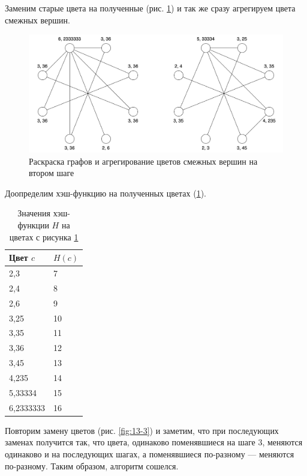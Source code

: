 \documentclass[12pt, a4paper]{extarticle}
\begin{document}
Заменим старые цвета на полученные (рис. \ref{fig:13-2}) и так же сразу агрегируем цвета смежных вершин.
 
\begin{figure}[h!]
    \centering
    \includegraphics[width=\textwidth]{task13-2.png}
    \caption{Раскраска графов и агрегирование цветов смежных вершин на втором шаге}
    \label{fig:13-2}
\end{figure}

Доопределим хэш-функцию на полученных цветах (\ref{tbl:13-2}).
\begin{table}[h!]
    \caption{Значения хэш-функции $H$ на цветах с рисунка \ref{fig:13-2}}
    \label{tbl:13-2}
    \begin{tabularx}{\textwidth}{|X|X|}
        \hline
        Цвет $c$ & $H(c)$ \\
        \hline
        2,3 & 7\\
        \hline
        2,4 & 8\\
        \hline
        2,6 & 9\\
        \hline
        3,25 & 10\\
        \hline
        3,35 & 11\\
        \hline
        3,36 & 12\\
        \hline
        3,45 & 13\\
        \hline
        4,235 & 14\\
        \hline
        5,33334 & 15\\
        \hline
        6,2333333 & 16\\
        \hline
    \end{tabularx}
\end{table}

Повторим замену цветов (рис. \ref{fig:13-3}) и заметим, что при последующих заменах получится так, что
цвета, одинаково поменявшиеся на шаге 3, меняются одинаково и на последующих шагах, а поменявшиеся по-разному
--- меняются по-разному. Таким образом, алгоритм сошелся.
 
\end{document}
